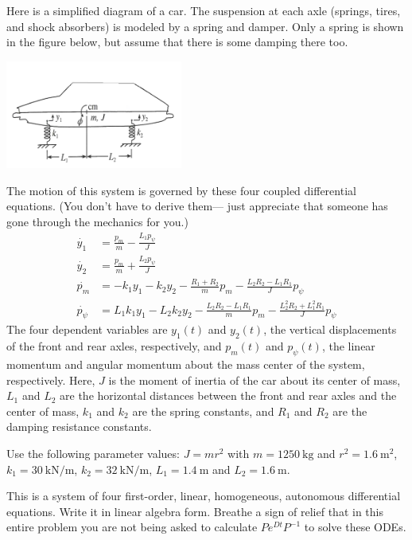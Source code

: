 \documentclass[boxes]{gsypset}
\begin{document}
\begin{problem}
	Here is a simplified diagram of a car. 
	The suspension at each axle (springs, tires, and shock absorbers) 
	is modeled by a spring and damper. 
	Only a spring is shown in the figure below, but assume that there is some damping there too.
	\begin{center}
		\includegraphics[keepaspectratio=true,height=1.4in]{img/hw08-car} 
	\end{center}

	The motion of this system is governed by these four coupled differential equations. 
	(You don't have to derive them---
	just appreciate that someone has gone through the mechanics for you.) 
	\begin{align*}
		\dot{y_1}&=\frac{p_m}{m}-\frac{L_1p_\psi}{J} \\
		\dot{y_2}&=\frac{p_m}{m}+\frac{L_2p_\psi}{J} \\
		\dot{p_m}&=-k_1y_1-k_2y_2-\frac{R_1+R_2}{m}p_m-\frac{L_2R_2-L_1R_1}{J}p_{\psi} \\
		\dot{p_\psi}&=L_1k_1y_1-L_2k_2y_2-\frac{L_2R_2-L_1R_1}{m}p_m-\frac{L_2^2R_2+L_1^2R_1}{J}p_{\psi}
	\end{align*}
	The four dependent variables are $y_1(t)$ and $y_2(t)$, 
	the vertical displacements of the front and rear axles, respectively, 
	and $p_m(t)$ and $p_{\psi}(t)$, 
	the linear momentum and angular momentum about the mass center of the system, respectively. 
	Here, $J$ is the moment of inertia of the car about its center of mass, 
	$L_1$ and $L_2$ are the horizontal distances between 
	the front and rear axles and the center of mass, 
	$k_1$ and $k_2$ are the spring constants, and 
	$R_1$ and $R_2$ are the damping resistance constants.
	
	Use the following parameter values: $J=mr^2$ with 
	$m=\SI{1250}{\kg}$ and $r^2=\SI{1.6}{\m^2}$, 
	$k_1=\SI{30}{\kN\per\m}$, $k_2=\SI{32}{\kN\per\m}$, 
	$L_1=\SI{1.4}{\m}$ and $L_2=\SI{1.6}{\m}$.
	\begin{subproblems}
		\subproblem
			This is a system of four first-order, linear, homogeneous, autonomous differential equations. 
			Write it in linear algebra form. 
			Breathe a sign of relief that in this entire problem you 
			are not being asked to calculate $Pe^{Dt}P^{-1}$ to solve these ODEs.
			\begin{solution}
				

\end{solution}
\end{subproblems}
\end{problem}
\end{document}
